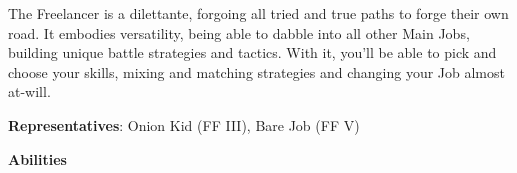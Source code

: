 \label{subsec:pjob-freelancer}
\begin{jobdesc}[name=pjob-freelancer]
    The Freelancer is a dilettante, forgoing all tried and true paths to forge their own road. It embodies versatility, being able to dabble into all other Main Jobs, building unique battle strategies and tactics. With it, you’ll be able to pick and choose your skills, mixing and matching strategies and changing your Job almost at-will. \pc

    \textbf{Representatives}: Onion Kid (FF III), Bare Job (FF V) \pc

    \jobstats[hpa=3x,hpb=4x,hpc=5x,hpd=6x,mpa=1x,mpc=2x,armor=?,weapons=?]
\end{jobdesc}

\begin{ffminipage}
{\centering \textbf{Abilities}\par }


\end{ffminipage}
